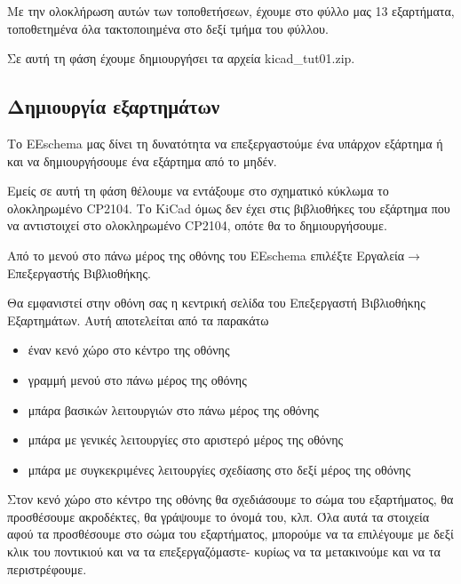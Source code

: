 \documentclass[a4paper]{article}
\begin{document}
Με την ολοκλήρωση αυτών των τοποθετήσεων, έχουμε στο φύλλο μας 13 εξαρτήματα, τοποθετημένα όλα τακτοποιημένα στο δεξί τμήμα του φύλλου.

\begin{figure}
  \begin{center}
    \label{fig:kicad-main}
  \end{center}
\end{figure}

Σε αυτή τη φάση έχουμε δημιουργήσει τα αρχεία kicad\_tut01.zip.

\subsection{Δημιουργία εξαρτημάτων}
Το EEschema μας δίνει τη δυνατότητα να επεξεργαστούμε ένα υπάρχον εξάρτημα ή και να δημιουργήσουμε ένα εξάρτημα από το μηδέν.

Εμείς σε αυτή τη φάση θέλουμε να εντάξουμε στο σχηματικό κύκλωμα το ολοκληρωμένο CP2104. Το KiCad όμως δεν έχει στις βιβλιοθήκες του εξάρτημα που να αντιστοιχεί στο ολοκληρωμένο CP2104, οπότε θα το δημιουργήσουμε.

Από το μενού στο πάνω μέρος της οθόνης του EEschema επιλέξτε Εργαλεία$\rightarrow$Επεξεργαστής Βιβλιοθήκης.

Θα εμφανιστεί στην οθόνη σας η κεντρική σελίδα του Επεξεργαστή Βιβλιοθήκης Εξαρτημάτων. Αυτή αποτελείται από τα παρακάτω
\begin{itemize}
    \item έναν κενό χώρο στο κέντρο της οθόνης
    \item γραμμή μενού στο πάνω μέρος της οθόνης
    \item μπάρα βασικών λειτουργιών στο πάνω μέρος της οθόνης
    \item μπάρα με γενικές λειτουργίες στο αριστερό μέρος της οθόνης
    \item μπάρα με συγκεκριμένες λειτουργίες σχεδίασης στο δεξί μέρος της οθόνης
\end{itemize}

Στον κενό χώρο στο κέντρο της οθόνης θα σχεδιάσουμε το σώμα του εξαρτήματος, θα προσθέσουμε ακροδέκτες, θα γράψουμε το όνομά του, κλπ. Όλα αυτά τα στοιχεία αφού τα προσθέσουμε στο σώμα του εξαρτήματος, μπορούμε να τα επιλέγουμε με δεξί κλικ του ποντικιού και να τα επεξεργαζόμαστε- κυρίως να τα μετακινούμε και να τα περιστρέφουμε.

\begin{figure}
  \begin{center}
    \label{fig:kicad-main}
  \end{center}
\end{figure}
\end{document}
